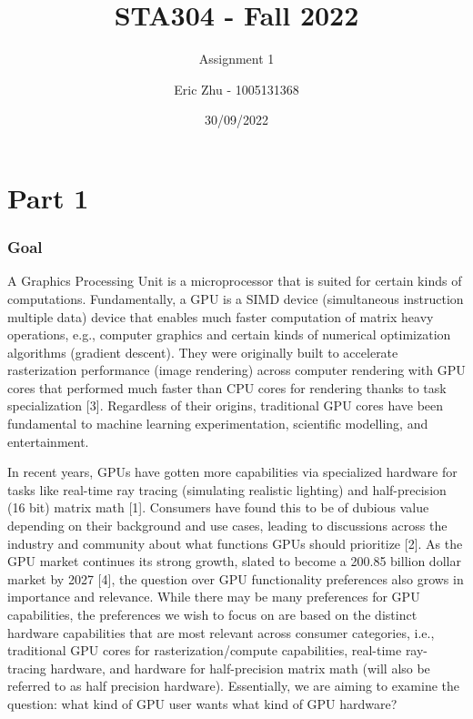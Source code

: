 \documentclass[
]{article}
\title{STA304 - Fall 2022}
\subtitle{Assignment 1}
\author{Eric Zhu - 1005131368}
\date{30/09/2022}
\begin{document}
\maketitle

\hypertarget{part-1}{%
\section{Part 1}\label{part-1}}

\hypertarget{goal}{%
\subsubsection{Goal}\label{goal}}

A Graphics Processing Unit is a microprocessor that is suited for
certain kinds of computations. Fundamentally, a GPU is a SIMD device
(simultaneous instruction multiple data) device that enables much faster
computation of matrix heavy operations, e.g., computer graphics and
certain kinds of numerical optimization algorithms (gradient descent).
They were originally built to accelerate rasterization performance
(image rendering) across computer rendering with GPU cores that
performed much faster than CPU cores for rendering thanks to task
specialization {[}3{]}. Regardless of their origins, traditional GPU
cores have been fundamental to machine learning experimentation,
scientific modelling, and entertainment.

In recent years, GPUs have gotten more capabilities via specialized
hardware for tasks like real-time ray tracing (simulating realistic
lighting) and half-precision (16 bit) matrix math {[}1{]}. Consumers
have found this to be of dubious value depending on their background and
use cases, leading to discussions across the industry and community
about what functions GPUs should prioritize {[}2{]}. As the GPU market
continues its strong growth, slated to become a 200.85 billion dollar
market by 2027 {[}4{]}, the question over GPU functionality preferences
also grows in importance and relevance. While there may be many
preferences for GPU capabilities, the preferences we wish to focus on
are based on the distinct hardware capabilities that are most relevant
across consumer categories, i.e., traditional GPU cores for
rasterization/compute capabilities, real-time ray-tracing hardware, and
hardware for half-precision matrix math (will also be referred to as
half precision hardware). Essentially, we are aiming to examine the
question: what kind of GPU user wants what kind of GPU hardware?
\end{document}
